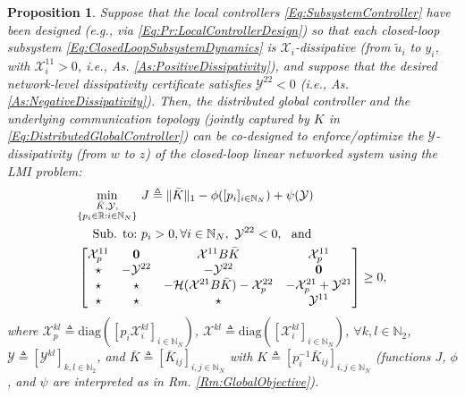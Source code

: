 \documentclass[letterpaper, 10 pt, conference]{ieeeconf}%
\newcommand{\R}{\mathbb{R}}
\newcommand{\N}{\mathbb{N}}
\newcommand{\0}{\mathbf{0}}
\newcommand{\X}{\mathcal{X}}
\newcommand{\Y}{\mathcal{Y}}
\newcommand{\diag}{\text{diag}}
\newcommand{\bm}[1]{\begin{bmatrix}#1\end{bmatrix}}
\newtheorem{proposition}{\textbf{Proposition}}
\begin{document}
\begin{proposition}\label{Pr:GlobalControllerDesign}
Suppose that the local controllers \eqref{Eq:SubsystemController} have been designed (e.g., via \eqref{Eq:Pr:LocalControllerDesign}) so that each closed-loop subsystem \eqref{Eq:ClosedLoopSubsystemDynamics} is $\X_i$-dissipative (from $\tilde{u}_i$ to $y_i$, with $\X_i^{11}>0$, i.e., As. \ref{As:PositiveDissipativity}), and suppose that the desired network-level dissipativity certificate satisfies $\Y^{22}<0$ (i.e., As. \ref{As:NegativeDissipativity}). Then, the distributed global controller and the underlying communication topology  (jointly captured by $K$ in \eqref{Eq:DistributedGlobalController}) can be co-designed to enforce/optimize the $\Y$-dissipativity (from $w$ to $z$) of the closed-loop linear networked system using the LMI problem:  
\begin{equation}\label{Eq:Pr:GlobalControllerDesign}
\begin{aligned}
\min_{\substack{\bar{K}, \Y, \\ \{p_i\in\R: i\in\N_N\}}}&\ J \triangleq \Vert \bar{K} \Vert_1 - \phi([p_i]_{i\in\N_N}) + \psi(\Y)\\
\mbox{Sub. to:}&\ p_i > 0, \forall i\in\N_N,\ \Y^{22}<0,\ \mbox{ and }\\
\span \bm{
\X_p^{11} & \0 & \X^{11} B \bar{K} & \X_p^{11} \\
\star & -\Y^{22} & -\Y^{22} & \0 \\ 
\star& \star & -\mathcal{H}(\X^{21} B \bar{K})-\X_p^{22} & -\X_p^{21}+\Y^{21} \\
\star & \star & \star &  \Y^{11}
} \geq 0,
\end{aligned}    
\end{equation}
where $\X_p^{kl} \triangleq \diag([p_i\X_i^{kl}]_{i\in\N_N})$, $\X^{kl} \triangleq \diag([\X^{kl}_i]_{i\in\N_N})$, $\forall k,l\in\N_2$, $\Y \triangleq [\Y^{kl}]_{k,l\in\N_2}$, and $\bar{K} \triangleq [\bar{K}_{ij}]_{i,j\in\N_N}$ with $K \triangleq [p_i^{-1} \bar{K}_{ij}]_{i,j\in\N_N}$ (functions $J$, $\phi$, and $\psi$ are interpreted as in Rm. \ref{Rm:GlobalObjective}).
\end{proposition}
\end{document}
